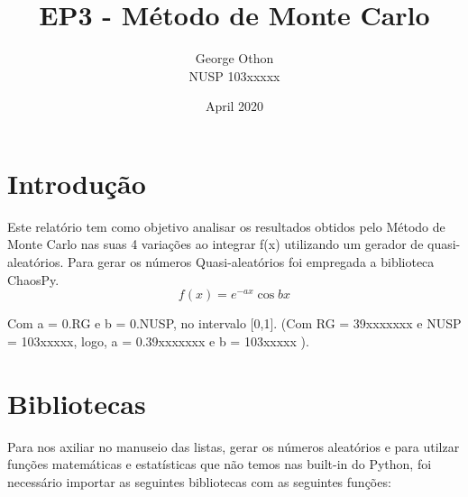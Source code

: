 \documentclass{article}
\title{EP3 - Método de Monte Carlo}
\author{George Othon\\NUSP 103xxxxx}
\date{April 2020}
\begin{document}
\maketitle

\section{Introdução}

\par
Este relatório tem como objetivo analisar os resultados obtidos pelo Método de Monte Carlo nas suas 4 variações ao integrar f(x) utilizando um gerador de quasi-aleatórios. Para gerar os números Quasi-aleatórios foi empregada a biblioteca ChaosPy.
\[
f(x) = e ^ {-ax} \cos{bx}
\]

Com a = 0.RG e b = 0.NUSP, no intervalo [0,1]. (Com RG = 39xxxxxxx e NUSP = 103xxxxx, logo, a  = 0.39xxxxxxx e b = 103xxxxx ).\\

\section{Bibliotecas}
Para nos axiliar no manuseio das listas, gerar os números aleatórios e para utilzar funções matemáticas e estatísticas que não temos nas built-in do Python, foi necessário importar as seguintes bibliotecas com as seguintes funções:
\end{document}
